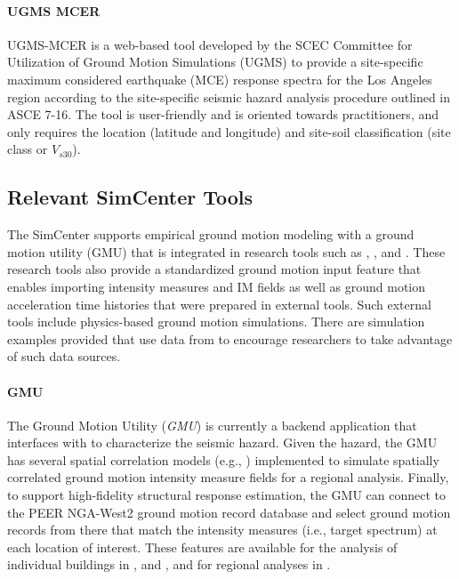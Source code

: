 \paragraph{UGMS MCER} UGMS-MCER \citep{crouse2018sitespecific} is a web-based tool developed by the SCEC Committee for Utilization of Ground Motion Simulations (UGMS) to provide a site-specific maximum considered earthquake (MCE) response spectra for the Los Angeles region according to the site-specific seismic hazard analysis procedure outlined in ASCE 7-16. The tool is user-friendly and is oriented towards practitioners, and only requires the location (latitude and longitude) and site-soil classification (site class or $V_{s30}$).

\subsection{Relevant SimCenter Tools}

The SimCenter supports empirical ground motion modeling with a ground motion utility (GMU) that is integrated in research tools such as , , and . These research tools also provide a standardized ground motion input feature that enables importing intensity measures and IM fields as well as ground motion acceleration time histories that were prepared in external tools. Such external tools include physics-based ground motion simulations. There are simulation examples provided that use data from  to encourage researchers to take advantage of such data sources. 

\paragraph{GMU} The Ground Motion Utility (\emph{GMU}) is currently a backend application that interfaces with  to characterize the seismic hazard. Given the hazard, the GMU has several spatial correlation models (e.g., \cite{jayaram2008correlation, markhvida2018modeling}) implemented to simulate spatially correlated ground motion intensity measure fields for a regional analysis. Finally, to support high-fidelity structural response estimation, the GMU can connect to the PEER NGA-West2 ground motion record database \citep{ancheta2014ngawest2} and select ground motion records from there that match the intensity measures (i.e., target spectrum) at each location of interest. These features are available for the analysis of individual buildings in , and , and for regional analyses in .

